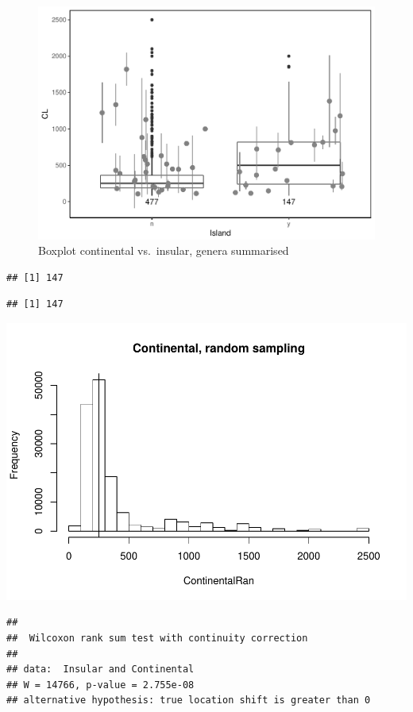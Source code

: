 \documentclass[]{article}
\begin{document}
\begin{figure}[htbp]
\centering
\includegraphics{MA_JJ_files/figure-latex/BPCI-1.pdf}
\caption{Boxplot continental vs.~insular, genera summarised}
\end{figure}

\begin{verbatim}
## [1] 147
\end{verbatim}

\begin{verbatim}
## [1] 147
\end{verbatim}

\includegraphics{MA_JJ_files/figure-latex/RSCI-1.pdf}

\begin{verbatim}
## 
##  Wilcoxon rank sum test with continuity correction
## 
## data:  Insular and Continental
## W = 14766, p-value = 2.755e-08
## alternative hypothesis: true location shift is greater than 0
\end{verbatim}
\end{document}
